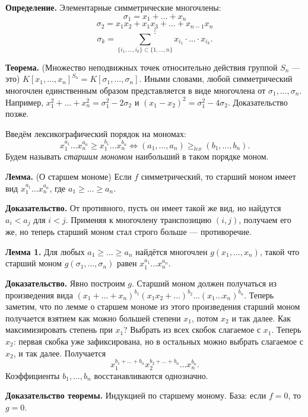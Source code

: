 \textbf{Определение.} Элементарные симметрические многочлены:
\[
    \sigma_1 = x_1 + \dots + x_n
\]
\[
    \sigma_2 = x_1x_2 + x_1x_3 + \dots + x_{n-1}x_n
\]
\[
    \vdots
\]
\[
    \sigma_k = \sum_{\{i_1, \dots, i_k\} \subset \{1, \dots, n\}} x_{i_1} \cdot \ldots \cdot x_{i_k}.
\]

\textbf{Теорема.} (Множество неподвижных точек относительно действия группой $S_n$ --- это) $K[x_1, \dots, x_n]^{S_n} = K[\sigma_1, \dots, \sigma_n]$.
Иными словами, любой симметрический многочлен единственным образом представляется в виде многочлена от $\sigma_1, \dots, \sigma_n$.
Например, $x_1^2 + \dots + x_n^2 = \sigma_1^2 - 2\sigma_2$ и $(x_1 - x_2)^2 = \sigma_1^2 - 4\sigma_2$.
Доказательство позже.

Введём лексикографический порядок на мономах:
\[
    x_1^{a_1} \dots x_n^{a_n} \ge x_1^{b_1} \dots x_n^{b_n} \iff (a_1, \dots, a_n) \ge_{lex} (b_1, \dots, b_n).
\]
Будем называть \textit{старшим мономом} наибольший в таком порядке моном.

\textbf{Лемма.} (О старшем мономе) Если $f$ симметрический, то старший моном имеет вид $x_1^{a_1} \dots x_n^{a_n}$, где $a_1 \ge \dots \ge a_n$.

\textbf{Доказательство.} От противного, пусть он имеет такой же вид, но найдутся $a_i < a_j$ для $i < j$.
Применяя к многочлену транспозицию $(i, j)$, получаем его же, но теперь старший моном стал строго больше --- противоречие.

\QED

\textbf{Лемма 1.} Для любых $a_1 \ge \dots \ge a_n$ найдётся многочлен $g(x_1, \dots, x_n)$, такой что старший моном $g(\sigma_1, \dots, \sigma_n)$ равен $x_1^{a_1} \dots x_n^{a_n}$.

\textbf{Доказательство.} Явно построим $g$. Старший моном должен получаться из произведения вида $(x_1 + \dots + x_n)^{b_1} (x_1x_2 + \dots)^{b_2} \dots (x_1 \dots x_n)^{b_n}$.
Теперь заметим, что по лемме о старшем мономе из этого произведения старший моном получается взятием как можно большей степени $x_1$, потом $x_2$ и так далее.
Как максимизировать степень при $x_1$? Выбрать из всех скобок слагаемое с $x_1$.
Теперь $x_2$: первая скобка уже зафиксирована, но в остальных можно выбрать слагаемое с $x_2$, и так далее.
Получается
\[
    x_1^{b_1 + \dots + b_n} x_2^{b_2 + \dots + b_n} \dots x_n^{b_n}.
\]
Коэффициенты $b_1, \dots, b_n$ восстанавливаются однозначно.

\QED

\textbf{Доказательство теоремы.} Индукцией по старшему моному.
База: если $f = 0$, то $g = 0$.

